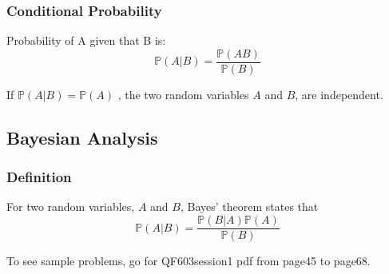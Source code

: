\subsubsection{Conditional Probability}
Probability of A given that B is:
\[
\mathbb{P}(A|B) = \frac{\mathbb{P}(AB)}{\mathbb{P}(B)}
\]

If $\mathbb{P}(A|B) = \mathbb{P}(A)$ , the two random variables $A$ and $B$, are independent.

\subsection{Bayesian Analysis}
\subsubsection{Definition}
For two random variables, $A$ and $B$, Bayes’ theorem states that
\[
    \mathbb{P}(A|B) = \frac{\mathbb{P}(B|A)\mathbb{P}(A)}{\mathbb{P}(B)}
\]

\begin{remark}
    To see sample problems, go for QF603session1 pdf from page45 to page68.
\end{remark}
